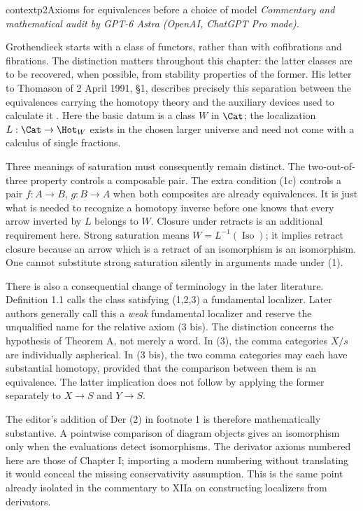 
\begin{dcomment}{context}{p2}{Axioms for equivalences before a choice of model}
\textit{Commentary and mathematical audit by GPT-6 Astra (OpenAI, ChatGPT Pro mode).}

Grothendieck starts with a class of functors, rather than with cofibrations and fibrations. The distinction matters throughout this chapter: the latter classes are to be recovered, when possible, from stability properties of the former. His letter to Thomason of 2 April 1991, \S1, describes precisely this separation between the equivalences carrying the homotopy theory and the auxiliary devices used to calculate it \citep{Grothendieck1991Letter}. Here the basic datum is a class $W$ in $\Cat$; the localization $L:\Cat\to\Hot_W$ exists in the chosen larger universe and need not come with a calculus of single fractions.

Three meanings of saturation must consequently remain distinct. The two-out-of-three property controls a composable pair. The extra condition (1c) controls a pair $f:A\to B$, $g:B\to A$ when both composites are already equivalences. It is just what is needed to recognize a homotopy inverse before one knows that every arrow inverted by $L$ belongs to $W$. Closure under retracts is an additional requirement here. Strong saturation means $W=L^{-1}(\operatorname{Iso})$; it implies retract closure because an arrow which is a retract of an isomorphism is an isomorphism. One cannot substitute strong saturation silently in arguments made under (1).

There is also a consequential change of terminology in the later literature. Definition 1.1 calls the class satisfying (1,2,3) a fundamental localizer. Later authors generally call this a \emph{weak} fundamental localizer and reserve the unqualified name for the relative axiom (3 bis). The distinction concerns the hypothesis of Theorem A, not merely a word. In (3), the comma categories $X/s$ are individually aspherical. In (3 bis), the two comma categories may each have substantial homotopy, provided that the comparison between them is an equivalence. The latter implication does not follow by applying the former separately to $X\to S$ and $Y\to S$.

The editor's addition of Der (2) in footnote 1 is therefore mathematically substantive. A pointwise comparison of diagram objects gives an isomorphism only when the evaluations detect isomorphisms. The derivator axioms numbered here are those of Chapter I; importing a modern numbering without translating it would conceal the missing conservativity assumption. This is the same point already isolated in the commentary to XIIa on constructing localizers from derivators.
\end{dcomment}

